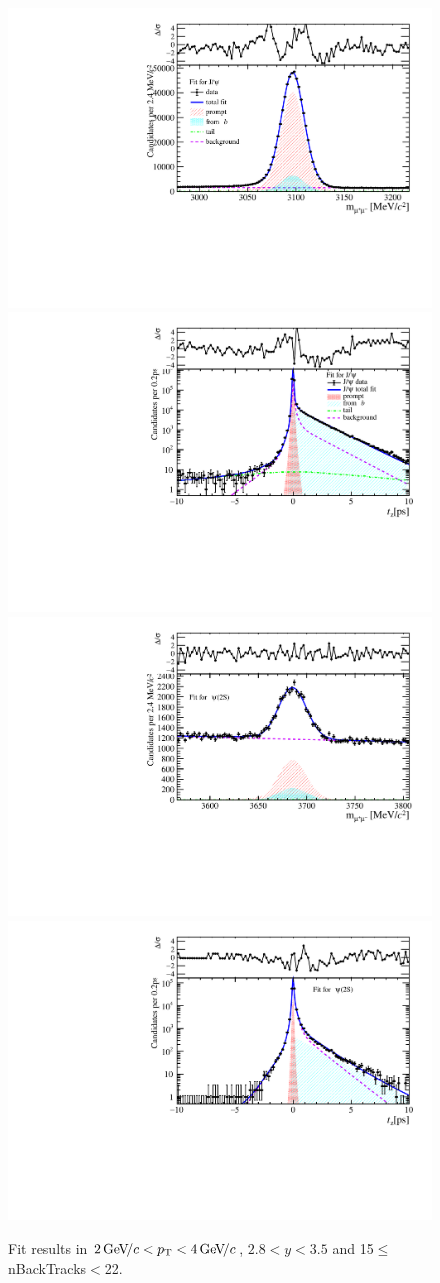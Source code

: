 \begin{figure}[H]
\begin{center}
\includegraphics[width=0.47\linewidth]{pdf/Jpsi/drawmassB/n3y2pt2.pdf}
\includegraphics[width=0.47\linewidth]{pdf/Jpsi/2DFitB/n3y2pt2.pdf}
\vspace*{-0.5cm}
\includegraphics[width=0.47\linewidth]{pdf/Psi2S/drawmassB/n3y2pt2.pdf}
\includegraphics[width=0.47\linewidth]{pdf/Psi2S/2DFitB/n3y2pt2.pdf}
\vspace*{-0.5cm}
\end{center}
\caption{Fit results in $2\text{\,Ge\kern -0.1em V\!/}c<p_{\mathrm{T}}<4\text{\,Ge\kern -0.1em V\!/}c$, $2.8<y<3.5$ and 15$\leq$nBackTracks$<$22.}
\label{Fitn3y2pt2}
\end{figure}
